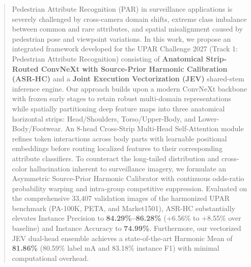 \begin{abstract}
Pedestrian Attribute Recognition (PAR) in surveillance applications is severely challenged by cross-camera domain shifts, extreme class imbalance between common and rare attributes, and spatial misalignment caused by pedestrian pose and viewpoint variations. In this work, we propose an integrated framework developed for the UPAR Challenge 2027 (Track 1: Pedestrian Attribute Recognition) consisting of \textbf{Anatomical Strip-Routed ConvNeXt with Source-Prior Harmonic Calibration (ASR-HC)} and a \textbf{Joint Execution Vectorization (JEV)} shared-stem inference engine. Our approach builds upon a modern ConvNeXt backbone with frozen early stages to retain robust multi-domain representations while spatially partitioning deep feature maps into three anatomical horizontal strips: Head/Shoulders, Torso/Upper-Body, and Lower-Body/Footwear. An 8-head Cross-Strip Multi-Head Self-Attention module refines token interactions across body parts with learnable positional embeddings before routing localized features to their corresponding attribute classifiers. To counteract the long-tailed distribution and cross-color hallucination inherent to surveillance imagery, we formulate an Asymmetric Source-Prior Harmonic Calibrator with continuous odds-ratio probability warping and intra-group competitive suppression. Evaluated on the comprehensive 33,407 validation images of the harmonized UPAR benchmark (PA-100K, PETA, and Market1501), ASR-HC substantially elevates Instance Precision to \textbf{84.29\%--86.28\%} (+6.56\% to +8.55\% over baseline) and Instance Accuracy to \textbf{74.99\%}. Furthermore, our vectorized JEV dual-head ensemble achieves a state-of-the-art Harmonic Mean of \textbf{81.86\%} (80.59\% label mA and 83.18\% instance F1) with minimal computational overhead.
\end{abstract}
